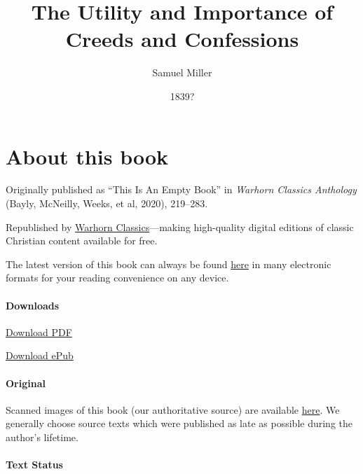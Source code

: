 \documentclass[
]{book}
\title{The Utility and Importance of Creeds and Confessions}
\author{Samuel Miller}
\date{1839?}
\begin{document}
\maketitle

\mainmatter
{}

{
\setcounter{tocdepth}{1}
\tableofcontents
}
\hypertarget{about-this-book}{%
\chapter*{About this book}\label{about-this-book}}

Originally published as ``This Is An Empty Book'' in \emph{Warhorn Classics Anthology} (Bayly, McNeilly, Weeks, et al, 2020), 219--283.

Republished by \href{https://classics.warhornmedia.com/}{Warhorn Classics}---making high-quality digital editions of classic Christian content available for free.

The latest version of this book can always be found \href{https://warhornmedia.github.io/miller-creeds-and-confessions/}{here} in many electronic formats for your reading convenience on any device.

\hypertarget{downloads}{%
\subsubsection*{Downloads}\label{downloads}}

\href{https://warhornmedia.github.io/miller-creeds-and-confessions//Miller-Creeds_and_Confessions.pdf}{Download PDF}

\href{https://warhornmedia.github.io/miller-creeds-and-confessions//Miller-Creeds_and_Confessions.epub}{Download ePub}

\hypertarget{original}{%
\subsubsection*{Original}\label{original}}

Scanned images of this book (our authoritative source) are available \href{https://archive.org/details/utilityimportanc00milluoft/page/n3/mode/2up}{here}. We generally choose source texts which were published as late as possible during the author's lifetime.

\hypertarget{text-status}{%
\subsubsection*{Text Status}\label{text-status}}
\end{document}
